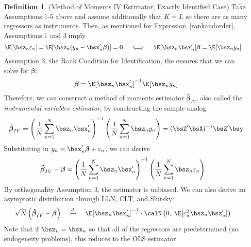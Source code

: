 \documentclass[12pt]{article}
\theoremstyle{plain}
\theoremstyle{definition}
\newtheorem{defn}[thm]{Definition}
\theoremstyle{remark}
\newcommand{\bsbeta}{\boldsymbol{\beta}}
\newcommand{\bshatbeta}{\boldsymbol{\hat{\beta}}}
\renewcommand{\bso}{\boldsymbol{0}}
\newcommand{\dto}{\xrightarrow{d}}
\newcommand{\sumnN}{\sum^N_{n=1}}
\begin{document}
\begin{defn}(Method of Moments IV Estimator, Exactly Identified Case)
Take Assumptions 1-5 above and assume additionally that $K=L$ so there
are as many regressors as instruments. Then, as mentioned for
Expression~\ref{rankandorder}, Assumptions 1 and 3 imply
\begin{align*}
  \E[\bsz_n\varepsilon_n]=
  \E[\bsz_n (y_n - \bsx'_n \bsbeta)]&=\bso
  \quad \iff \quad
  \E[\bsz_n\bsx'_n] \bsbeta = \E[\bsz_n y_n]
\end{align*}
Assumption 3, the Rank Condition for Identification, the ensures that we
can solve for $\bsbeta$:
\begin{align*}
  \bsbeta = \E[\bsz_n\bsx'_n]^{-1}\E[\bsz_n y_n]
\end{align*}
Therefore, we can construct a method of moments estimator
$\bshatbeta_{IV}$, also called the
\emph{instrumental variables estimator}, by constructing the sample
analog:
\begin{align*}
  \bshatbeta_{IV} =
  \left(\frac{1}{N}\sumnN\bsz_n\bsx'_n\right)^{-1}
  \left(\frac{1}{N}\sumnN \bsz_n y_n\right)
  =
  (\bsZ'\bsX)^{-1}\bsZ'\bsy
\end{align*}
Substituting in $y_n=\bsx_n'\bsbeta + \varepsilon_n$, we can derive
\begin{align*}
  \bshatbeta_{IV} - \bsbeta
  &=
  \left(\frac{1}{N}\sumnN\bsz_n\bsx'_n\right)^{-1}
  \left( \frac{1}{N} \sumnN \bsz_n \varepsilon_n\right)
\end{align*}
By orthogonality Assumption 3, the estimator is unbiased. We can also
derive an asymptotic distribution through LLN, CLT, and Slutsky:
\begin{align*}
  \sqrt{N}\left(\bshatbeta_{IV} - \bsbeta\right)
  &\quad\dto\quad
  \E[\bsz_n\bsx'_n]^{-1}
  \cdot
  \calN\left(0,\;\E[\varepsilon_n^2\bsz_n\bsz_n']\right)
\end{align*}
Note that if $\bsz_n=\bsx_n$ so that all of the regressors are
predetermined (no endogeneity problems), this reduces to the OLS
estimator.
\end{defn}
\end{document}
